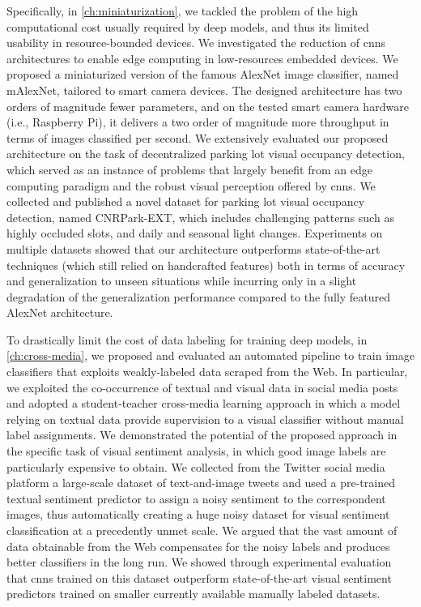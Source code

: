 Specifically, in \ref{ch:miniaturization}, we tackled the problem of the high computational cost usually required by deep models, and thus its limited usability in resource-bounded devices.
We investigated the reduction of \glspl{cnn} architectures to enable edge computing in low-resources embedded devices.
We proposed a miniaturized version of the famous AlexNet image classifier, named mAlexNet, tailored to smart camera devices.
The designed architecture has two orders of magnitude fewer parameters, and on the tested smart camera hardware (i.e., Raspberry Pi), it delivers a two order of magnitude more throughput in terms of images classified per second.
We extensively evaluated our proposed architecture on the task of decentralized parking lot visual occupancy detection, which served as an instance of problems that largely benefit from an edge computing paradigm and the robust visual perception offered by \glspl{cnn}.
We collected and published a novel dataset for parking lot visual occupancy detection, named CNRPark-EXT, which includes challenging patterns such as highly occluded slots, and daily and seasonal light changes.
Experiments on multiple datasets showed that our architecture outperforms state-of-the-art techniques (which still relied on handcrafted features) both in terms of accuracy and generalization to unseen situations while incurring only in a slight degradation of the generalization performance compared to the fully featured AlexNet architecture.

To drastically limit the cost of data labeling for training deep models, in \ref{ch:cross-media}, we proposed and evaluated an automated pipeline to train image classifiers that exploits weakly-labeled data scraped from the Web.
In particular, we exploited the co-occurrence of textual and visual data in social media posts and adopted a student-teacher cross-media learning approach in which a model relying on textual data provide supervision to a visual classifier without manual label assignments.
We demonstrated the potential of the proposed approach in the specific task of visual sentiment analysis, in which good image labels are particularly expensive to obtain.
We collected from the Twitter social media platform a large-scale dataset of text-and-image tweets and used a pre-trained textual sentiment predictor to assign a noisy sentiment to the correspondent images, thus automatically creating a huge noisy dataset for visual sentiment classification at a precedently unmet scale.
We argued that the vast amount of data obtainable from the Web compensates for the noisy labels and produces better classifiers in the long run.
We showed through experimental evaluation that \glspl{cnn} trained on this dataset outperform state-of-the-art visual sentiment predictors trained on smaller currently available manually labeled datasets.

